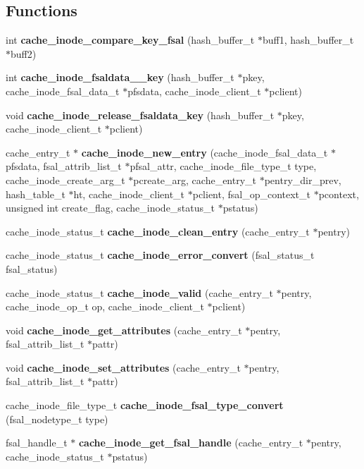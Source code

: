 \subsection*{Functions}
\begin{DoxyCompactItemize}
\item 
int {\bf cache\_\-inode\_\-compare\_\-key\_\-fsal} (hash\_\-buffer\_\-t $\ast$buff1, hash\_\-buffer\_\-t $\ast$buff2)
\item 
int {\bf cache\_\-inode\_\-fsaldata\_\_\-key} (hash\_\-buffer\_\-t $\ast$pkey, cache\_\-inode\_\-fsal\_\-data\_\-t $\ast$pfsdata, cache\_\-inode\_\-client\_\-t $\ast$pclient)
\item 
void {\bf cache\_\-inode\_\-release\_\-fsaldata\_\-key} (hash\_\-buffer\_\-t $\ast$pkey, cache\_\-inode\_\-client\_\-t $\ast$pclient)
\item 
cache\_\-entry\_\-t $\ast$ {\bf cache\_\-inode\_\-new\_\-entry} (cache\_\-inode\_\-fsal\_\-data\_\-t $\ast$pfsdata, fsal\_\-attrib\_\-list\_\-t $\ast$pfsal\_\-attr, cache\_\-inode\_\-file\_\-type\_\-t type, cache\_\-inode\_\-create\_\-arg\_\-t $\ast$pcreate\_\-arg, cache\_\-entry\_\-t $\ast$pentry\_\-dir\_\-prev, hash\_\-table\_\-t $\ast$ht, cache\_\-inode\_\-client\_\-t $\ast$pclient, fsal\_\-op\_\-context\_\-t $\ast$pcontext, unsigned int create\_\-flag, cache\_\-inode\_\-status\_\-t $\ast$pstatus)
\item 
cache\_\-inode\_\-status\_\-t {\bf cache\_\-inode\_\-clean\_\-entry} (cache\_\-entry\_\-t $\ast$pentry)
\item 
cache\_\-inode\_\-status\_\-t {\bf cache\_\-inode\_\-error\_\-convert} (fsal\_\-status\_\-t fsal\_\-status)
\item 
cache\_\-inode\_\-status\_\-t {\bf cache\_\-inode\_\-valid} (cache\_\-entry\_\-t $\ast$pentry, cache\_\-inode\_\-op\_\-t op, cache\_\-inode\_\-client\_\-t $\ast$pclient)
\item 
void {\bf cache\_\-inode\_\-get\_\-attributes} (cache\_\-entry\_\-t $\ast$pentry, fsal\_\-attrib\_\-list\_\-t $\ast$pattr)
\item 
void {\bf cache\_\-inode\_\-set\_\-attributes} (cache\_\-entry\_\-t $\ast$pentry, fsal\_\-attrib\_\-list\_\-t $\ast$pattr)
\item 
cache\_\-inode\_\-file\_\-type\_\-t {\bf cache\_\-inode\_\-fsal\_\-type\_\-convert} (fsal\_\-nodetype\_\-t type)
\item 
fsal\_\-handle\_\-t $\ast$ {\bf cache\_\-inode\_\-get\_\-fsal\_\-handle} (cache\_\-entry\_\-t $\ast$pentry, cache\_\-inode\_\-status\_\-t $\ast$pstatus)
\item 

\end{DoxyCompactItemize}
